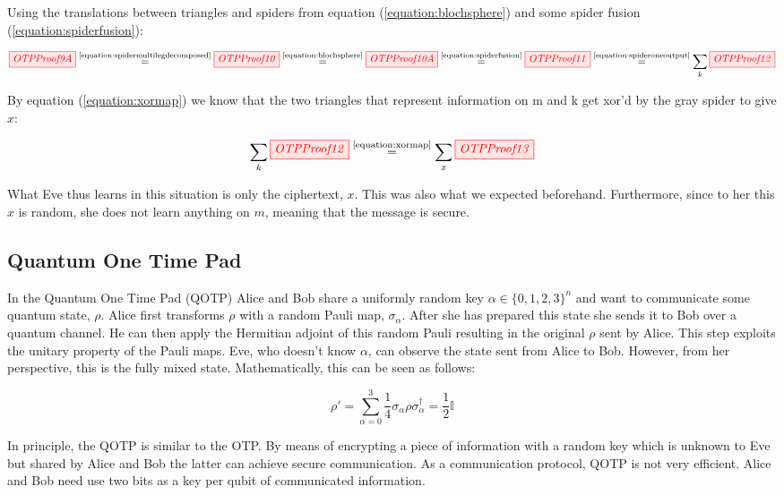 \documentclass[]{article}
\newcommand{\equaltext}[1]{\ensuremath{\stackrel{\text{#1}}{=}}}
\begin{document}
Using the translations between triangles and spiders from equation (\ref{equation:blochsphere}) and some spider fusion (\ref{equation:spiderfusion}):

\begin{equation}
\tikzfig{OTPProof9A} \equaltext{\ref{equation:spidermultilegdecomposed}} \tikzfig{OTPProof10} \equaltext{\ref{equation:blochsphere}} \tikzfig{OTPProof10A} \equaltext{\ref{equation:spiderfusion}} \tikzfig{OTPProof11} \equaltext{\ref{equation:spideroneoutput}} \sum\limits_{k} \tikzfig{OTPProof12}
\end{equation}

By equation (\ref{equation:xormap}) we know that the two triangles that represent information on m and k get xor'd by the gray spider to give $x$:

\begin{equation}
\sum\limits_{k} \tikzfig{OTPProof12} \equaltext{\ref{equation:xormap}} \sum\limits_{x} \tikzfig{OTPProof13}
\end{equation}

What Eve thus learns in this situation is only the ciphertext, $x$. This was also what we expected beforehand. Furthermore, since to her this $x$ is random, she does not learn anything on $m$, meaning that the message is secure.

\subsection{Quantum One Time Pad}
\label{QOTP}
In the Quantum One Time Pad (QOTP) Alice and Bob share a uniformly random key $ \alpha \in \{0,1,2,3\}^n$ and want to communicate some quantum state, $\rho$. Alice first transforms $\rho$ with a random Pauli map, $\sigma_\alpha$. After she has prepared this state she sends it to Bob over a quantum channel. He can then apply the Hermitian adjoint of this random Pauli resulting in the original $\rho$ sent by Alice. This step exploits the unitary property of the Pauli maps. Eve, who doesn't know $\alpha$, can observe the state sent from Alice to Bob. However, from her perspective, this is the fully mixed state. Mathematically, this can be seen as follows:

\begin{equation}
	\label{equation:OTPsecurity}
	\rho' = \sum\limits_{\alpha = 0}^3 \frac{1}{4} \sigma_\alpha \rho \sigma_\alpha^\dagger = \frac{1}{2}\mathbb{I}
\end{equation}

In principle, the QOTP is similar to the OTP. By means of encrypting a piece of information with a random key which is unknown to Eve but shared by Alice and Bob the latter can achieve secure communication. As a communication protocol, QOTP is not very efficient. Alice and Bob need use two bits as a key per qubit of communicated information.
\end{document}
